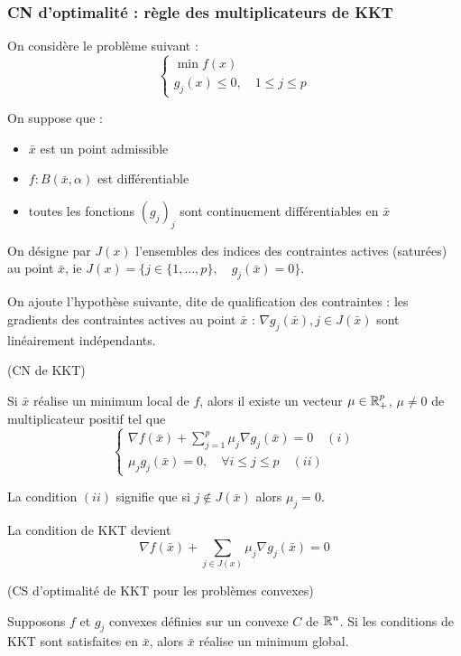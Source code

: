 	\subsubsection{CN d'optimalité : règle des multiplicateurs de KKT}
	
	On considère le problème suivant : \[ \begin{cases}\min f(x) \\ g_j(x) \leq 0 , \quad 1 \leq j \leq p \end{cases} \]
	
	On suppose que :
\begin{itemize}
	\item $\bar{x}$ est un point admissible
	\item $f:B(\bar{x},\alpha)$ est différentiable
	\item toutes les fonctions $(g_j)_j$ sont continuement différentiables en $\bar{x}$
\end{itemize}

On désigne par $J(x)$ l'ensembles des indices des contraintes actives (saturées) au point $\bar{x}$, ie $J(x) = \{ j \in \{ 1, \dots, p \}, \quad g_j(\bar{x}) = 0 \} $.

On ajoute l'hypothèse suivante, dite de qualification des contraintes : les gradients des contraintes actives au point $\bar{x}$ : $\nabla g_j(\bar{x}), {j\in J(\bar{x})}$ sont linéairement indépendants.

\begin{theoreme} (CN de KKT)
	
	Si $\bar{x}$ réalise un minimum local de $f$, alors il existe un vecteur $\mu \in \mathbb{R}_+^p$, $\mu \ne 0$ de multiplicateur positif tel que \[ \begin{cases} \displaystyle \nabla f(\bar{x}) + \sum_{j=1}^p \mu _j \nabla g_j (\bar{x}) = 0 \quad (i) \\ \mu _j g_j(\bar{x}) = 0, \quad \forall i \leq j \leq p \quad (ii) \end{cases} \]
	
\end{theoreme}

\begin{remarque}
La condition $(ii)$ signifie que si $j \not \in J(\bar{x})$ alors $\mu_j = 0$.

La condition de KKT devient \[ \nabla f(\bar{x}) + \sum_{j \in J(x)} \mu _j \nabla g_j (\bar{x}) = 0 \]
\end{remarque}

\begin{theoreme} (CS d'optimalité de KKT pour les problèmes convexes)

Supposons $f$ et $g_j$ convexes définies sur un convexe $C$ de $\mathbb{R}^n$. Si les conditions de KKT sont satisfaites en $\bar{x}$, alors $\bar{x}$ réalise un minimum global.
\end{theoreme}

